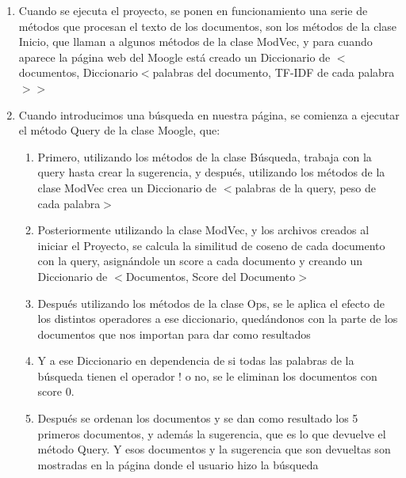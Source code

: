 \documentclass[12pt, a4paper]{article}
\begin{document}
\begin{enumerate}
      \item Cuando se ejecuta el proyecto, se ponen en funcionamiento una serie de métodos que procesan el texto de los documentos, son los métodos de la clase Inicio, que llaman a algunos métodos de la clase ModVec, y para cuando aparece la página web del Moogle está creado un Diccionario de
            $<$documentos, Diccionario$<$palabras del documento, TF-IDF de cada palabra$>>$
      \item Cuando introducimos una búsqueda en nuestra página, se comienza a ejecutar el método Query de la clase Moogle, que:
            \begin{enumerate}
                  \item Primero, utilizando los métodos de la clase Búsqueda, trabaja con
                        la query hasta crear la sugerencia,  y después, utilizando los métodos
                        de la clase ModVec crea un Diccionario de
                        $<$palabras de la query, peso de cada palabra$>$
                  \item Posteriormente utilizando la clase ModVec, y los archivos creados al iniciar el Proyecto, se calcula la similitud de coseno de cada documento con la query, asignándole un score a cada documento y creando un Diccionario de
                        $<$Documentos, Score del Documento$>$
                  \item Después utilizando los métodos de la clase Ops,
                        se le aplica el efecto de los distintos operadores a ese
                        diccionario, quedándonos con la parte de los documentos
                        que nos importan para dar como resultados
                  \item Y a ese Diccionario en dependencia de si todas las palabras de la búsqueda tienen el operador ! o no, se le eliminan los documentos con score 0.
                  \item Después se ordenan los documentos y se dan como resultado los 5 primeros documentos, y además la sugerencia, que es lo que devuelve el método Query.
                        Y esos documentos y la sugerencia que son devueltas son mostradas en la página donde el usuario hizo la búsqueda
            \end{enumerate}

\end{enumerate}
\end{document}
